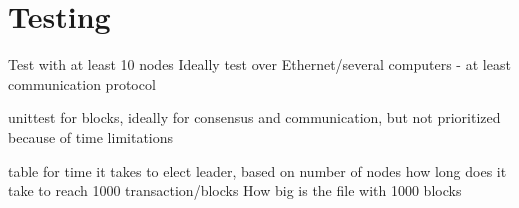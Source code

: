 \chapter{Testing}
Test with at least 10 nodes
Ideally test over Ethernet/several computers - at least communication protocol

unittest for blocks, ideally for consensus and communication, but not prioritized because of time limitations

table for time it takes to elect leader, based on number of nodes
how long does it take to reach 1000 transaction/blocks
How big is the file with 1000 blocks 